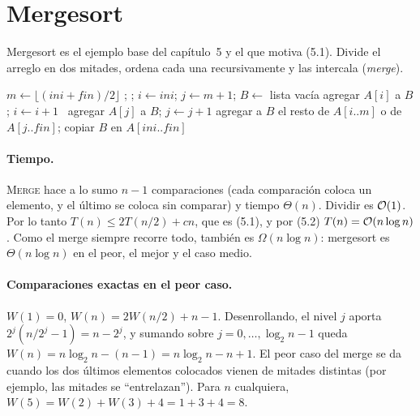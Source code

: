 \section{Mergesort}

Mergesort es el ejemplo base del capítulo~5 y el que motiva (5.1). Divide el arreglo en dos mitades, ordena cada una recursivamente y las intercala (\emph{merge}).

\begin{algorithmic}[1]
 
    \State $m\gets\lfloor (ini+fin)/2\rfloor$
    \State {};\; ;\; 
  \EndIf
\EndFunction
{} 
  \State $i\gets ini$;\; $j\gets m+1$;\; $B\gets$ lista vacía
     agregar $A[i]$ a $B$;\; $i\gets i+1$ 
    \Else\ agregar $A[j]$ a $B$;\; $j\gets j+1$
    \EndIf
  \EndWhile
  \State agregar a $B$ el resto de $A[i..m]$ o de $A[j..fin]$;\; copiar $B$ en $A[ini..fin]$
\EndFunction
\end{algorithmic}

\paragraph{Tiempo.} \textsc{Merge} hace a lo sumo $n-1$ comparaciones (cada comparación coloca un elemento, y el último se coloca sin comparar) y tiempo $\Theta(n)$. Dividir es $\mathcal{O}(1)$. Por lo tanto $T(n)\le 2T(n/2)+cn$, que es (5.1), y por (5.2) $T(n)=\mathcal{O}(n\log n)$. Como el merge siempre recorre todo, también es $\Omega(n\log n)$: mergesort es $\Theta(n\log n)$ en el peor, el mejor y el caso medio.

\paragraph{Comparaciones exactas en el peor caso.} $W(1)=0$, $W(n)=2W(n/2)+n-1$. Desenrollando, el nivel $j$ aporta $2^j(n/2^j-1)=n-2^j$, y sumando sobre $j=0,\dots,\log_2n-1$ queda $W(n)=n\log_2 n-(n-1)=n\log_2 n-n+1$. El peor caso del merge se da cuando los dos últimos elementos colocados vienen de mitades distintas (por ejemplo, las mitades se ``entrelazan''). Para $n$ cualquiera, $W(5)=W(2)+W(3)+4=1+3+4=8$.

